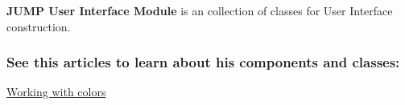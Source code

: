 {\bfseries JUMP User Interface Module} is an collection of classes for User Interface construction. \subsubsection*{See this articles to learn about his components and classes:}


\begin{DoxyItemize}
\item \hyperlink{colors}{Working with colors} \par
 
\end{DoxyItemize}
